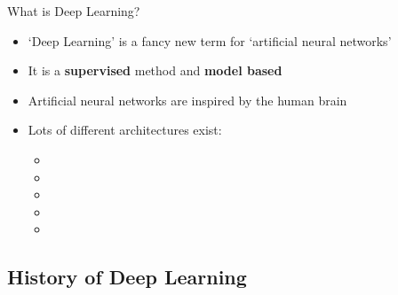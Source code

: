 \begin{frame}{What is Deep Learning?}{}
	\begin{itemize}
		\item `Deep Learning' is a fancy new term for `artificial neural networks' 
		\item It is a \textbf{supervised} method and \textbf{model based}
		\item Artificial neural networks are inspired by the human brain
		\item Lots of different architectures exist:
		\begin{itemize}
			\item {}
			\item {}
			\item {}
			\item {}
			\item {}
		\end{itemize}
	\end{itemize}
\end{frame}


\subsection{History of Deep Learning}


